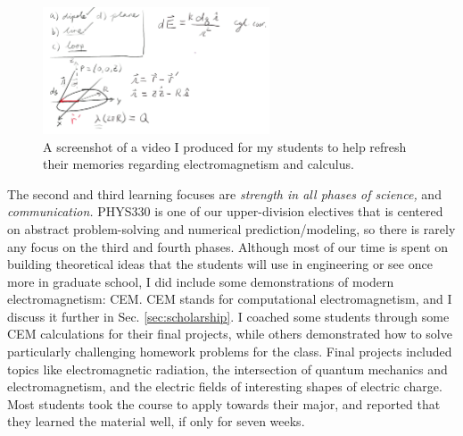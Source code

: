 \documentclass[../../../main.tex]{subfiles}
\begin{document}
\\
\vspace{0.25cm}
\begin{figure}
\centering
\includegraphics[width=0.6\textwidth]{figures/video_330.png}
\caption{\label{fig:video} A screenshot of a video I produced for my students to help refresh their memories regarding electromagnetism and calculus.}
\end{figure}

The second and third learning focuses are \textit{strength in all phases of science,} and \textit{communication.}  PHYS330 is one of our upper-division electives that is centered on abstract problem-solving and numerical prediction/modeling, so there is rarely any focus on the third and fourth phases.  Although most of our time is spent on building theoretical ideas that the students will use in engineering or see once more in graduate school, I did include some demonstrations of modern electromagnetism: CEM.  CEM stands for computational electromagnetism, and I discuss it further in Sec. \ref{sec:scholarship}.  I coached some students through some CEM calculations for their final projects, while others demonstrated how to solve particularly challenging homework problems for the class.  Final projects included topics like electromagnetic radiation, the intersection of quantum mechanics and electromagnetism, and the electric fields of interesting shapes of electric charge.  Most students took the course to apply towards their major, and reported that they learned the material well, if only for seven weeks.
\end{document}
